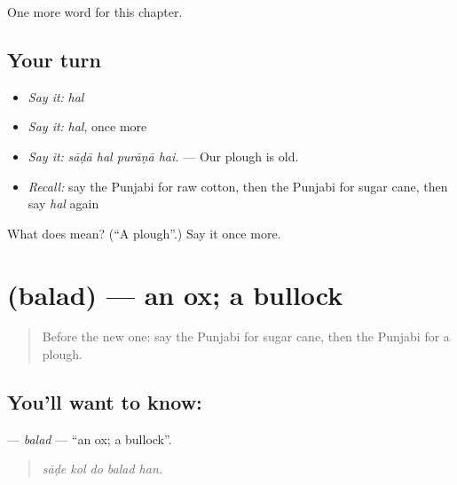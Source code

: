 \begin{grammarlens}[title={What you've built}]
One more word for this chapter.
\end{grammarlens}

\subsection*{Your turn}
\begin{itemize}
\raggedright
  \item \emph{Say it:} \emph{hal}
  \item \emph{Say it:} \emph{hal}, once more
  \item \emph{Say it:} \emph{sāḍā hal purāṇā hai.} — Our plough is old.
  \item \emph{Recall:} say the Punjabi for raw cotton, then the Punjabi for sugar cane, then say \emph{hal} again
\end{itemize}

\begin{tcolorbox}[breakable,colback=teal!4,colframe=teal!35!black,title={Before you move on}]
What does  mean? (\textquotedblleft{}A plough\textquotedblright{}.) Say it once more.
\end{tcolorbox}
\section[\texorpdfstring{\pa{ਬਲਦ} (balad)}{ਬਲਦ (balad)}]{ (balad) — an ox; a bullock}

\label{lesson:PA-C301-balad}



\begin{quote}
Before the new one: say the Punjabi for sugar cane, then the Punjabi for a plough.
\end{quote}

\subsection*{You'll want to know: }
\textbf{} — \emph{balad} — \textquotedblleft{}an ox; a bullock\textquotedblright{}.

\begin{quote}
    
\end{quote}

\begin{quote}
\emph{sāḍe kol do balad han.}
\end{quote}

